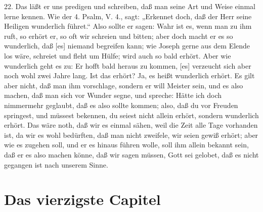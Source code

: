 22. Das läßt er uns predigen und schreiben, daß man seine Art und Weise einmal lerne kennen. Wie der 4. Psalm, V. 4., sagt: „Erkennet doch, daß der Herr seine Heiligen wunderlich führet.“ Also sollte er sagen: Wahr ist es, wenn man zu ihm ruft, so erhört er, so oft wir schreien und bitten; aber doch macht er es so wunderlich, daß [es] niemand begreifen kann; wie Joseph gerne aus dem Elende los wäre, schreiet und fleht um Hülfe; wird auch so bald erhört. Aber wie wunderlich geht es zu: Er hofft bald heraus zu kommen, [es] verzeucht sich aber noch wohl zwei Jahre lang. Ist das erhört? Ja, es heißt wunderlich erhört. Es gilt aber nicht, daß man ihm vorschlage, sondern er will Meister sein, und es also machen, daß man sich vor Wunder segne, und spreche: Hätte ich doch nimmermehr geglaubt, daß es also sollte kommen; also, daß du vor Freuden springest, und müssest bekennen, du seiest nicht allein erhört, sondern wunderlich erhört. Das wäre noth, daß wir es einmal sähen, weil die Zeit alle Tage vorhanden ist, da wir es wohl bedürften, daß man nicht zweifele, wir seien gewiß erhört; aber wie es zugehen soll, und er es hinaus führen wolle, soll ihm allein bekannt sein, daß er es also machen könne, daß wir sagen müssen, Gott sei gelobet, daß es nicht gegangen ist nach unserem Sinne.

\section{Das vierzigste Capitel}

